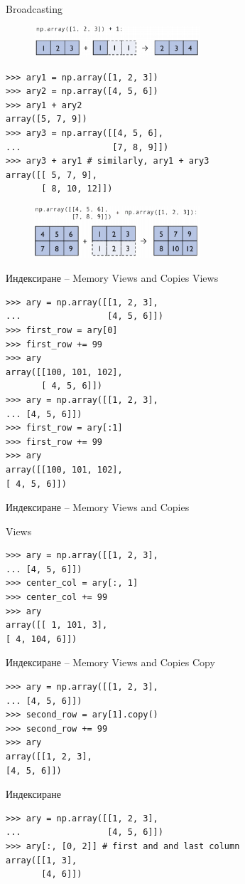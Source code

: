 \documentclass{beamer}
\begin{document}
\begin{frame}[fragile]{Broadcasting}
\begin{figure}
    \centering
    \includegraphics[width=0.55\textwidth]{np5.png}
\end{figure}
\begin{verbatim}
>>> ary1 = np.array([1, 2, 3])
>>> ary2 = np.array([4, 5, 6])
>>> ary1 + ary2
array([5, 7, 9])
>>> ary3 = np.array([[4, 5, 6],
...                  [7, 8, 9]])
>>> ary3 + ary1 # similarly, ary1 + ary3
array([[ 5, 7, 9],
       [ 8, 10, 12]])
\end{verbatim}
\begin{figure}
    \centering
    \includegraphics[width=0.55\textwidth]{np6.png}
\end{figure}
\end{frame}

\begin{frame}[fragile]{Индексиране – Memory Views and Copies}
Views
\begin{verbatim}
>>> ary = np.array([[1, 2, 3],
...                 [4, 5, 6]])
>>> first_row = ary[0]
>>> first_row += 99
>>> ary
array([[100, 101, 102],
       [ 4, 5, 6]])
>>> ary = np.array([[1, 2, 3],
... [4, 5, 6]])
>>> first_row = ary[:1]
>>> first_row += 99
>>> ary
array([[100, 101, 102],
[ 4, 5, 6]])
\end{verbatim}
\end{frame}

\begin{frame}[fragile]{Индексиране – Memory Views and Copies}

Views
\begin{verbatim}
>>> ary = np.array([[1, 2, 3],
... [4, 5, 6]])
>>> center_col = ary[:, 1]
>>> center_col += 99
>>> ary
array([[ 1, 101, 3],
[ 4, 104, 6]])
\end{verbatim}
\end{frame}

\begin{frame}[fragile]{Индексиране – Memory Views and Copies}
Copy
\begin{verbatim}
>>> ary = np.array([[1, 2, 3],
... [4, 5, 6]])
>>> second_row = ary[1].copy()
>>> second_row += 99
>>> ary
array([[1, 2, 3],
[4, 5, 6]])
\end{verbatim}
Индексиране
\begin{verbatim}
>>> ary = np.array([[1, 2, 3],
...                 [4, 5, 6]])
>>> ary[:, [0, 2]] # first and and last column
array([[1, 3],
       [4, 6]])
\end{verbatim}
\end{frame}
\end{document}
